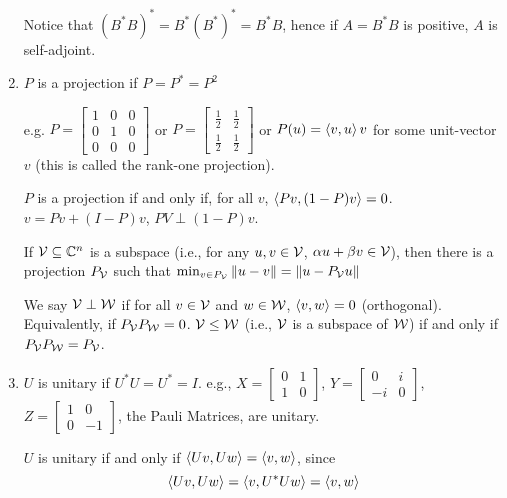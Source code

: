 \begin{enumerate}[label=\arabic*.]
          Notice that $(B^*B)^* = B^*(B^*)^* = B^*B$, hence if $A = B^*B$ is positive,
          $A$ is self-adjoint.
    \item $P$ is a projection if $P = P^* = P^2$

          e.g. $P = \begin{bmatrix}1&0&0\\0&1&0\\0&0&0\end{bmatrix}$ or
          $P = \begin{bmatrix}\frac{1}{2} & \frac{1}{2}\\\frac{1}{2}&\frac{1}{2}\end{bmatrix}$
          or $P(u) = \left\langle v, u\right\rangle v$ for some unit-vector $v$ (this is called
          the rank-one projection).

          $P$ is a projection if and only if, for all $v$, $\left\langle Pv, (1-P)v\right\rangle = 0$.
          $v = Pv + (I - P)v$, $PV \perp (1 - P)v$.

          If $\mathcal{V} \subseteq \mathbb{C}^n$ is a subspace (i.e., for any $u, v\in\mathcal{V}$, $\alpha u + \beta v\in \mathcal{V}$), then there is a
          projection $P_{\mathcal{V}}$ such that $\min_{v\in P_{\mathcal{V}}}\left\lVert u - v\right\rVert = \left\lVert u - P_{\mathcal{V}}u\right\rVert$

          We say $\mathcal{V} \perp \mathcal{W}$ if for all $v \in \mathcal{V}$
          and $w\in \mathcal{W}$, $\left\langle v, w\right\rangle= 0$ (orthogonal). Equivalently,
          if $P_{\mathcal{V}}P_{\mathcal{W}} = 0$. $\mathcal{V} \leq \mathcal{W}$
          (i.e., $\mathcal{V}$ is a subspace of $\mathcal{W}$) if and only if
          $P_{\mathcal{V}}P_{\mathcal{W}} = P_{\mathcal{V}}$.

    \item $U$ is unitary if $U^*U = U^* = I$.
          e.g., $X = \begin{bmatrix}0&1\\1&0\end{bmatrix}$, $Y = \begin{bmatrix}0&i\\-i&0\end{bmatrix}$, $Z = \begin{bmatrix}1&0\\0&-1\end{bmatrix}$, the Pauli Matrices,
          are unitary.

          $U$ is unitary if and only if $\left\langle Uv, Uw\right\rangle = \left\langle v, w\right\rangle$, since
          \[\left\langle Uv, Uw\right\rangle = \left\langle v, U^*Uw\right\rangle = \left\langle v, w\right\rangle\]


\end{enumerate}
